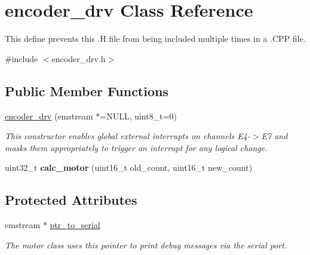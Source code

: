 \hypertarget{classencoder__drv}{\section{encoder\-\_\-drv Class Reference}
\label{classencoder__drv}
}


This define prevents this .H file from being included multiple times in a .C\-P\-P file.  




{\ttfamily \#include $<$encoder\-\_\-drv.\-h$>$}

\subsection*{Public Member Functions}
\begin{DoxyCompactItemize}
\item 
\hyperlink{classencoder__drv_a25af67f4725b47983ceb8ce4edf3296a}{encoder\-\_\-drv} (emstream $\ast$=N\-U\-L\-L, uint8\-\_\-t=0)
\begin{DoxyCompactList}\small\item\em This constructor enables global external interrupts on channels E4-\/$>$E7 and masks them appropriately to trigger an interrupt for any logical change. \end{DoxyCompactList}\item 
\hypertarget{classencoder__drv_acaf570bdfd03b1852079caaae11721be}{uint32\-\_\-t {\bfseries calc\-\_\-motor} (uint16\-\_\-t old\-\_\-count, uint16\-\_\-t new\-\_\-count)}\label{classencoder__drv_acaf570bdfd03b1852079caaae11721be}

\end{DoxyCompactItemize}
\subsection*{Protected Attributes}
\begin{DoxyCompactItemize}
\item 
\hypertarget{classencoder__drv_a9efa5138b331c06f0821b087168d2fda}{emstream $\ast$ \hyperlink{classencoder__drv_a9efa5138b331c06f0821b087168d2fda}{ptr\-\_\-to\-\_\-serial}}\label{classencoder__drv_a9efa5138b331c06f0821b087168d2fda}

\begin{DoxyCompactList}\small\item\em The motor class uses this pointer to print debug messages via the serial port. \end{DoxyCompactList}\end{DoxyCompactItemize}


